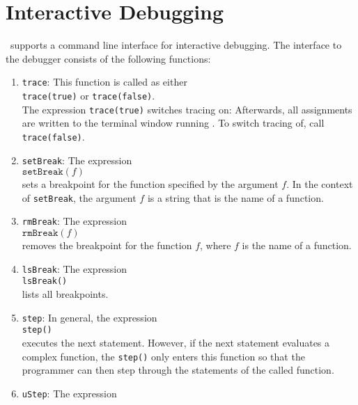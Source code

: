 \section{Interactive Debugging}
\setlx\ supports a command line interface for interactive debugging.  The interface to the
debugger consists of the following functions:
\begin{enumerate}
\item \texttt{trace}:  This function is called as either
      \\[0.2cm]
      \hspace*{1.3cm}
      \texttt{trace(true)} \quad or \quad \texttt{trace(false)}.
      \\[0.2cm]
      The expression \texttt{trace(true)} switches tracing on:  Afterwards, all
      assignments are written to the terminal window running \setlx.  To switch tracing
      of, call \texttt{trace(false)}.
\item \texttt{setBreak}:  The expression 
      \\[0.2cm]
      \hspace*{1.3cm}
      $\texttt{setBreak}(f)$
      \\[0.2cm]
      sets a breakpoint for the function specified by the argument $f$.  
      In the context of \texttt{setBreak}, the argument $f$ is a string that is the
      name of a function.
\item \texttt{rmBreak}:  The expression 
      \\[0.2cm]
      \hspace*{1.3cm}
      $\texttt{rmBreak}(f)$
      \\[0.2cm]
      removes the breakpoint for the function $f$, where $f$ is the name of a function.
\item \texttt{lsBreak}: The expression
      \\[0.2cm]
      \hspace*{1.3cm}
      \texttt{lsBreak()}
      \\[0.2cm]
      lists all breakpoints.
\item \texttt{step}: In general, the expression
      \\[0.2cm]
      \hspace*{1.3cm}
      \texttt{step()}
      \\[0.2cm]
      executes the next statement.  However, if the next statement evaluates a complex
      function, the \texttt{step()} only enters this function so that the programmer can
      then step through the statements of the called function.
\item \texttt{uStep}: The expression

\end{enumerate}
